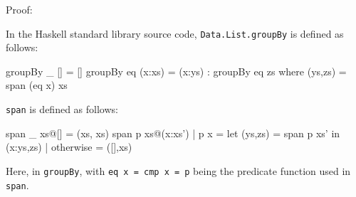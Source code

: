 \documentclass[../main.tex]{subfiles}
\begin{document}
Proof:

In the Haskell standard library source code, \texttt{Data.List.groupBy} is defined as follows\cite{hstdlib}:

\begin{code}
groupBy _  []           =  []
groupBy eq (x:xs)       =  (x:ys) : groupBy eq zs
where (ys,zs) = span (eq x) xs
\end{code}

\texttt{span} is defined as follows\cite{hstdlib}:

\begin{code}
span _ xs@[]            =  (xs, xs)
span p xs@(x:xs')
| p x          =  let (ys,zs) = span p xs' in (x:ys,zs)
| otherwise    =  ([],xs)
\end{code}





Here,  in \texttt{groupBy}, with \texttt{eq x = cmp x = p} being the predicate function used in \texttt{span}. %



\end{document}
